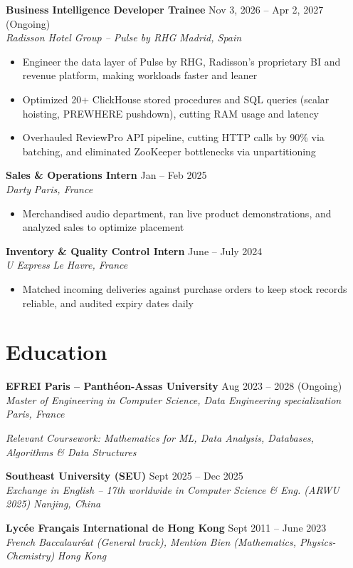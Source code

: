 \documentclass[10pt,a4paper]{article}
\newcommand{\secgap}{\vspace{3.5pt plus 1.5pt minus 1pt}}
\newcommand{\itemgap}{\vspace{2pt plus 1pt minus 0.5pt}}
\newcommand{\job}[4]{%
  \textbf{#1} \hfill #2\\
  \textit{#3} \hfill \textit{#4}\par\vspace{0.5pt}
}
\newcommand{\edu}[4]{%
  \textbf{#1} \hfill #2\\
  \textit{#3} \hfill \textit{#4}\par\vspace{0.5pt}
}
\begin{document}
\job{Business Intelligence Developer Trainee}{Nov 3, 2026 -- Apr 2, 2027 (Ongoing)}{Radisson Hotel Group -- Pulse by RHG}{Madrid, Spain}
\begin{itemize}
  \item Engineer the data layer of Pulse by RHG, Radisson's proprietary BI and revenue platform, making workloads faster and leaner
  \item Optimized 20+ ClickHouse stored procedures and SQL queries (scalar hoisting, PREWHERE pushdown), cutting RAM usage and latency
  \item Overhauled ReviewPro API pipeline, cutting HTTP calls by 90\% via batching, and eliminated ZooKeeper bottlenecks via unpartitioning
\end{itemize}

\itemgap
\job{Sales \& Operations Intern}{Jan -- Feb 2025}{Darty}{Paris, France}
\begin{itemize}
  \item Merchandised audio department, ran live product demonstrations, and analyzed sales to optimize placement
\end{itemize}

\itemgap
\job{Inventory \& Quality Control Intern}{June -- July 2024}{U Express}{Le Havre, France}
\begin{itemize}
  \item Matched incoming deliveries against purchase orders to keep stock records reliable, and audited expiry dates daily
\end{itemize}

\secgap
\section{Education}

\edu{EFREI Paris -- Panthéon-Assas University}{Aug 2023 -- 2028 (Ongoing)}{Master of Engineering in Computer Science, Data Engineering specialization}{Paris, France}
\vspace{-1.5pt}
\textit{\small Relevant Coursework: Mathematics for ML, Data Analysis, Databases, Algorithms \& Data Structures}

\itemgap
\edu{Southeast University (SEU)}{Sept 2025 -- Dec 2025}{Exchange in English -- 17th worldwide in Computer Science \& Eng. (ARWU 2025)}{Nanjing, China}

\itemgap
\edu{Lycée Français International de Hong Kong}{Sept 2011 -- June 2023}{French Baccalauréat (General track), Mention Bien (Mathematics, Physics-Chemistry)}{Hong Kong}
\end{document}
